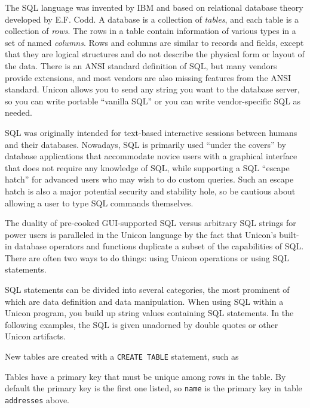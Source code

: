 The SQL language was invented by IBM and based on relational database
theory developed by E.F. Codd. A database is a collection of
\textit{tables}, and each table is a collection of \textit{rows}. The
rows in a table contain information of various types in a set of named
\textit{columns}. Rows and columns are similar to records and fields,
except that they are logical structures and do not describe the physical
form or layout of the data. There is an ANSI standard definition of
SQL, but many vendors provide extensions, and most vendors are also
missing features from the ANSI standard. Unicon allows you to send any
string you want to the database server, so you can write portable
``vanilla SQL'' or you can write vendor-specific SQL as needed.

SQL was originally intended for text-based interactive sessions
between humans and their databases. Nowadays, SQL is primarily used
``under the covers'' by database applications that accommodate novice
users with a graphical interface that does not require any knowledge
of SQL, while supporting a SQL ``escape hatch'' for advanced users who
may wish to do custom queries. Such an escape hatch is also a major
potential security and stability hole, so be cautious about allowing a
user to type SQL commands themselves.

The duality of pre-cooked GUI-supported SQL versus arbitrary SQL
strings for power users is paralleled in the Unicon language by the
fact that Unicon's built-in database operators and functions duplicate
a subset of the capabilities of SQL. There are often two ways to do
things: using Unicon operations or using SQL statements.

SQL statements can be divided into several categories, the most
prominent of which are data definition and data manipulation. When
using SQL within a Unicon program, you build up string values
containing SQL statements. In the following examples, the SQL is given
unadorned by double quotes or other Unicon artifacts.

New tables are created with a \texttt{CREATE TABLE} statement, such as


Tables have a primary key that must be unique among rows in the table.
By default the primary key is the first one listed, so \texttt{name} is
the primary key in table \texttt{addresses} above.

